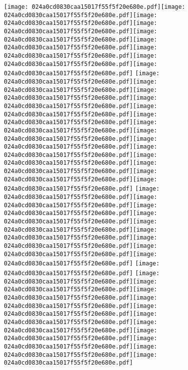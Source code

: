 \documentclass{article}
\newcommand{\origpg}[2]{\texttt{[image: 024a0cd0830caa15017f55f5f20e680e.pdf]}}
\begin{document}
{\vspace{19.754pt}\hspace{18.094pt}\origpg{14}{103.4pt 513.26pt 112.03pt 529.4pt}\origpg{14}{112.03pt 513.26pt 119.2pt 529.4pt}\hspace{-0.629pt}\origpg{14}{118.57pt 513.26pt 126.69pt 529.4pt}\hspace{-0.161pt}\origpg{14}{126.53pt 513.26pt 133.69pt 529.4pt}\hspace{0.291pt}\origpg{14}{133.98pt 513.26pt 142.04pt 529.4pt}\origpg{14}{141.94pt 513.26pt 149.3pt 529.4pt}\origpg{14}{149.4pt 513.26pt 158.03pt 529.4pt}\hspace{-0.21pt}\origpg{14}{157.82pt 513.26pt 168.67pt 529.4pt}\origpg{14}{168.67pt 513.26pt 175.83pt 529.4pt} \origpg{14}{63.5mm 513.26pt 187.29pt 529.4pt}\hspace{-0.355pt}\origpg{14}{186.94pt 513.26pt 194.1pt 529.4pt}\hspace{-0.178pt}\origpg{14}{193.93pt 513.26pt 202pt 529.4pt}\hspace{-0.355pt}\origpg{14}{201.64pt 513.26pt 211.86pt 529.4pt}\hspace{0.129pt}\origpg{14}{211.99pt 513.26pt 219.15pt 529.4pt}\hspace{-0.178pt}\origpg{14}{218.98pt 513.26pt 226.03pt 529.4pt}\hspace{0.161pt}\origpg{14}{226.19pt 513.26pt 234.26pt 529.4pt}\origpg{14}{234.36pt 513.26pt 242.99pt 529.4pt}\origpg{14}{242.99pt 513.26pt 251.11pt 529.4pt}\origpg{14}{251.21pt 513.26pt 258.38pt 529.4pt}\hspace{0.29pt}\origpg{14}{258.67pt 513.26pt 265.83pt 529.4pt}\hspace{-0.178pt}\origpg{14}{265.65pt 513.26pt 273.5pt 529.4pt}\origpg{14}{273.6pt 513.26pt 282.23pt 529.4pt}\origpg{14}{282.23pt 513.26pt 289.4pt 529.4pt} \origpg{14}{294.29pt 513.26pt 302.92pt 529.4pt}\origpg{14}{302.92pt 513.26pt 310.09pt 529.4pt}\hspace{-0.145pt}\origpg{14}{309.94pt 513.26pt 318.01pt 529.4pt}\origpg{14}{318.11pt 513.26pt 325.28pt 529.4pt}\origpg{14}{325.33pt 513.26pt 335.54pt 529.4pt}\origpg{14}{335.45pt 513.26pt 342.61pt 529.4pt}\hspace{-0.178pt}\origpg{14}{342.43pt 513.26pt 349.49pt 529.4pt}\origpg{14}{349.42pt 513.26pt 357.49pt 529.4pt}\origpg{14}{357.59pt 513.26pt 368.44pt 529.4pt} \origpg{14}{373.47pt 513.26pt 382.11pt 529.4pt} \origpg{14}{386.93pt 513.26pt 395.57pt 529.4pt}\hspace{-0.21pt}\origpg{14}{395.36pt 513.26pt 403.43pt 529.4pt}\origpg{14}{403.53pt 513.26pt 410.69pt 529.4pt}\hspace{-0.42pt}\origpg{14}{410.27pt 513.26pt 418.49pt 529.4pt}\origpg{14}{418.49pt 513.26pt 425.65pt 529.4pt}\origpg{14}{425.65pt 513.26pt 433.5pt 529.4pt}\origpg{14}{433.4pt 513.26pt 440.57pt 529.4pt}\origpg{14}{440.62pt 513.26pt 446.99pt 529.4pt}\hspace{-0.113pt}\origpg{14}{446.88pt 513.26pt 454.04pt 529.4pt}\hspace{-0.42pt}\origpg{14}{453.62pt 513.26pt 460.68pt 529.4pt}\hspace{-0.307pt}\origpg{14}{460.37pt 513.26pt 467.73pt 529.4pt} }
\end{document}
